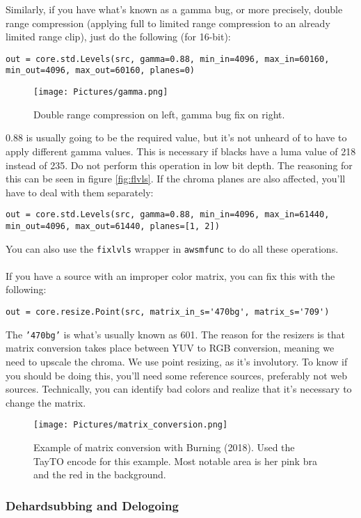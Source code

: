 \documentclass{scrartcl}
\begin{document}
Similarly, if you have what's known as a gamma bug, or more precisely, double range compression (applying full to limited range compression to an already limited range clip), just do the following (for 16-bit):
\begin{lstlisting}
out = core.std.Levels(src, gamma=0.88, min_in=4096, max_in=60160, min_out=4096, max_out=60160, planes=0)
\end{lstlisting}
\begin{figure}[h]
\centering
\texttt{[image: Pictures/gamma.png]}
\caption{Double range compression on left, gamma bug fix on right.}\label{fig:9}
\end{figure}
0.88 is usually going to be the required value, but it's not unheard of to have to apply different gamma values.  This is necessary if blacks have a luma value of 218 instead of 235. Do not perform this operation in low bit depth.  The reasoning for this can be seen in figure \ref{fig:flvls}. If the chroma planes are also affected, you'll have to deal with them separately:
\begin{lstlisting}
out = core.std.Levels(src, gamma=0.88, min_in=4096, max_in=61440, min_out=4096, max_out=61440, planes=[1, 2])
\end{lstlisting}
You can also use the \texttt{fixlvls} wrapper in \texttt{awsmfunc} to do all these operations.\\
\\
If you have a source with an improper color matrix, you can fix this with the following:
\begin{lstlisting}
out = core.resize.Point(src, matrix_in_s='470bg', matrix_s='709')
\end{lstlisting}
The \texttt{'470bg'} is what's usually known as 601.
The reason for the resizers is that matrix conversion takes place between YUV to RGB conversion, meaning we need to upscale the chroma.  We use point resizing, as it's involutory.  To know if you should be doing this, you'll need some reference sources, preferably not web sources.  Technically, you can identify bad colors and realize that it's necessary to change the matrix.
\begin{figure}[h]
\texttt{[image: Pictures/matrix\_conversion.png]}
\caption{Example of matrix conversion with Burning (2018).  Used the TayTO encode for this example.  Most notable area is her pink bra and the red in the background.}\label{fig:27}
\end{figure}

\subsubsection{Dehardsubbing and Delogoing}
\end{document}
